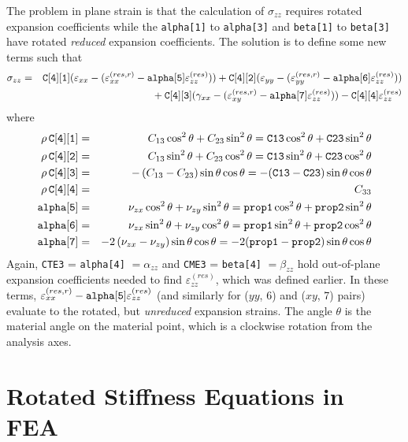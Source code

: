 \documentclass[11pt]{book}
\def\a#1{\alpha_{#1}}
\def\b#1{\beta_{#1}}
\def\code#1{{\small\tt #1}}
\def\e#1{\varepsilon_{#1}}
\def\er#1{\varepsilon_{#1}^{(res)}}
\def\err#1{\varepsilon_{#1}^{(res,r)}}
\def\g#1{\gamma_{#1}}
\def\s#1{\sigma_{#1}}
\def\v#1{\nu_{#1}}
\begin{document}
The problem in plane strain is that the calculation of $\s{zz}$ requires rotated expansion coefficients while the \code{alpha[1]} to \code{alpha[3]}  and \code{beta[1]} to \code{beta[3]} have rotated {\em reduced\/} expansion coefficients. The solution is to define some new terms such that
\begin{eqnarray}
     \s{zz} & = & \code{C[4][1]} (\e{xx} -(\err{xx}-\code{alpha[5]}\er{zz}))
                         +  \code{C[4][2]}(\e{yy} -(\err{yy}-\code{alpha[6]}\er{zz})) 
     \nonumber \\
     && \qquad\qquad\mbox{}
                 + \code{C[4][3]}(\g{xx}-(\err{xy}-\code{alpha[7]}\er{zz}))  - \code{C[4][4]} \er{zz}
\end{eqnarray}
where
\begin{eqnarray}
 \rho\thinspace \code{C[4][1]} & = &C_{13}\cos^2\theta + C_{23}\sin^2\theta
            = \code{C13}\cos^2\theta + \code{C23}\sin^2\theta  \\
 \rho\thinspace \code{C[4][2]} & = &C_{13}\sin^2\theta + C_{23}\cos^2\theta
             = \code{C13}\sin^2\theta + \code{C23}\cos^2\theta  \\
 \rho\thinspace \code{C[4][3]} & = & - \left(C_{13} - C_{23}\right)\sin\theta\cos\theta
             =  -(\code{C13}-\code{C23})\sin\theta\cos\theta \\
 \rho\thinspace \code{C[4][4]} & = & C_{33}  \\
  \code{alpha[5]} & = &\v{zx}\cos^2\theta + \v{zy}\sin^2\theta
         = \code{prop1}\cos^2\theta + \code{prop2}\sin^2\theta  \\
  \code{alpha[6]} & = &\v{zx}\sin^2\theta + \v{zy}\cos^2\theta
        = \code{prop1}\sin^2\theta + \code{prop2}\cos^2\theta  \\
  \code{alpha[7]} & = & - 2\left(\v{zx} - \v{zy}\right)\sin\theta\cos\theta 
       =  -2(\code{prop1}-\code{prop2})\sin\theta\cos\theta
\end{eqnarray}
Again, \code{CTE3} = \code{alpha[4]} $=\a{zz}$ and \code{CME3} = \code{beta[4]} $=\b{zz}$ hold out-of-plane expansion coefficients needed to find $\er{zz}$, which was defined earlier.
In these terms, $\err{xx}-\code{alpha[5]}\er{zz}$ (and similarly for ($yy$, 6) and ($xy$, 7) pairs) evaluate to the rotated, but {\em unreduced\/} expansion strains. The angle $\theta$ is the material angle on the material point, which is a clockwise rotation from the analysis axes.

\section{Rotated Stiffness Equations in FEA}
\end{document}
